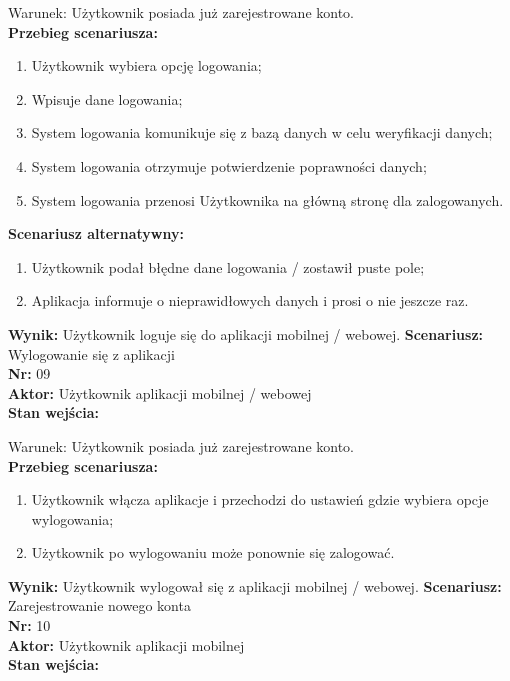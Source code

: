 \documentclass[12pt,a4paper]{article}
\begin{document}
Warunek: Użytkownik posiada już zarejestrowane konto.
\\{\bf Przebieg scenariusza:}
\begin{enumerate}
\item Użytkownik wybiera opcję logowania;
\item Wpisuje dane logowania;
\item System logowania komunikuje się z bazą danych w celu weryfikacji danych;
\item System logowania otrzymuje potwierdzenie poprawności danych;
\item System logowania przenosi Użytkownika na główną stronę dla zalogowanych.
\end{enumerate}
{\bf Scenariusz alternatywny:}
\begin{enumerate}
\item Użytkownik podał błędne dane logowania / zostawił puste pole;
\item Aplikacja informuje o nieprawidłowych danych i prosi o nie jeszcze raz.
\end{enumerate}
{\bf Wynik:} Użytkownik loguje się do aplikacji mobilnej / webowej.
\newline\newline
{\large \bf Scenariusz:} Wylogowanie się z aplikacji
\\{\bf Nr:} 09
\\{\bf Aktor:} Użytkownik aplikacji mobilnej / webowej
\\{\bf Stan wejścia:}

Warunek: Użytkownik posiada już zarejestrowane konto.
\\{\bf Przebieg scenariusza:}
\begin{enumerate}
\item Użytkownik włącza aplikacje i przechodzi do ustawień gdzie wybiera opcje wylogowania;
\item Użytkownik po wylogowaniu może ponownie się zalogować.
\end{enumerate}
{\bf Wynik:} Użytkownik wylogował się z aplikacji mobilnej / webowej.
\newline\newline\newline\newline\newline\newline\newline\newline\newline\newline\newline\newline\newline\newline
{\large \bf Scenariusz:} Zarejestrowanie nowego konta
\\{\bf Nr:} 10
\\{\bf Aktor:} Użytkownik aplikacji mobilnej
\\{\bf Stan wejścia:}
\end{document}

